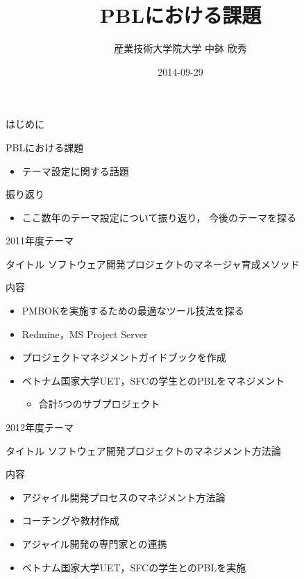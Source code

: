 \documentclass[t]{beamer}
\author{産業技術大学院大学 \linebreak 中鉢 欣秀}
\date{2014-09-29}
\title{PBLにおける課題}
\begin{document}
\maketitle

\begin{frame}[label=sec-1]{はじめに}
\begin{block}{PBLにおける課題}
\begin{itemize}
\item テーマ設定に関する話題
\end{itemize}
\end{block}

\begin{block}{振り返り}
\begin{itemize}
\item ここ数年のテーマ設定について振り返り，
今後のテーマを探る
\end{itemize}
\end{block}
\end{frame}
\begin{frame}[label=sec-2]{2011年度テーマ}
\begin{block}{タイトル}
ソフトウェア開発プロジェクトのマネージャ育成メソッド
\end{block}

\begin{block}{内容}
\begin{itemize}
\item PMBOKを実施するための最適なツール技法を探る
\item Redmine，MS Project Server
\item プロジェクトマネジメントガイドブックを作成
\item ベトナム国家大学UET，SFCの学生とのPBLをマネジメント
\begin{itemize}
\item 合計5つのサブプロジェクト
\end{itemize}
\end{itemize}
\end{block}
\end{frame}
\begin{frame}[label=sec-3]{2012年度テーマ}
\begin{block}{タイトル}
ソフトウェア開発プロジェクトのマネジメント方法論
\end{block}

\begin{block}{内容}
\begin{itemize}
\item アジャイル開発プロセスのマネジメント方法論
\item コーチングや教材作成
\item アジャイル開発の専門家との連携
\item ベトナム国家大学UET，SFCの学生とのPBLを実施
\end{itemize}
\end{block}
\end{frame}
\end{document}
